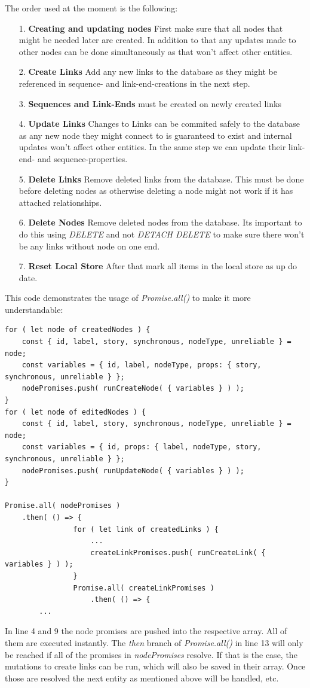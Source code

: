 The order used at the moment is the following:
\begin{itemize}
\item[1.] \textbf{Creating and updating nodes} First make sure that all nodes that might be needed later are created. In addition to that any updates made to other nodes can be done simultaneously as that won't affect other entities.
\item[2.] \textbf{Create Links} Add any new links to the database as they might be referenced in sequence- and link-end-creations in the next step.
\item[3.] \textbf{Sequences and Link-Ends} must be created on newly created links
\item[4.] \textbf{Update Links} Changes to Links can be commited safely to the database as any new node they might connect to is guaranteed to exist and internal updates won't affect other entities. In the same step we can update their link-end- and sequence-properties.
\item[5.] \textbf{Delete Links} Remove deleted links from the database. This must be done before deleting nodes as otherwise deleting a node might not work if it has attached relationships.
\item[6.] \textbf{Delete Nodes} Remove deleted nodes from the database. Its important to do this using \emph{DELETE} and not \emph{DETACH DELETE} to make sure there won't be any links without node on one end.
\item[7.] \textbf{Reset Local Store} After that mark all items in the local store as up do date.
\end{itemize}

This code demonstrates the usage of \emph{Promise.all()} to make it more understandable:
\begin{lstlisting}[caption={Usage of Promise.all()}]
for ( let node of createdNodes ) {
	const { id, label, story, synchronous, nodeType, unreliable } = node;
	const variables = { id, label, nodeType, props: { story, synchronous, unreliable } };
	nodePromises.push( runCreateNode( { variables } ) );
}
for ( let node of editedNodes ) {
	const { id, label, story, synchronous, nodeType, unreliable } = node;
	const variables = { id, props: { label, nodeType, story, synchronous, unreliable } };
	nodePromises.push( runUpdateNode( { variables } ) );
}

Promise.all( nodePromises ) 
	.then( () => {
				for ( let link of createdLinks ) {
					...
					createLinkPromises.push( runCreateLink( { variables } ) );				
				}
				Promise.all( createLinkPromises )
					.then( () => {	
		...
\end{lstlisting}
In line 4 and 9 the node promises are pushed into the respective array. All of them are executed instantly. The \emph{then} branch of \emph{Promise.all()} in line 13 will only be reached if all of the promises in \emph{nodePromises} resolve. If that is the case, the mutations to create links can be run, which will also be saved in their array. Once those are resolved the next entity as mentioned above will be handled, etc.

